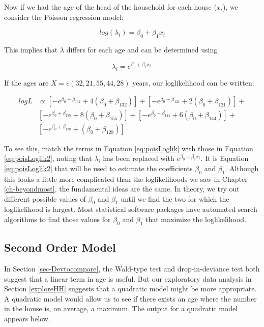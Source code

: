 \documentclass[
]{krantz}
\begin{document}
Now if we had the age of the head of the household for each house (\(x_i\)), we consider the Poisson regression model:

\[log(\lambda_i)=\beta_0+\beta_1x_i \]

This implies that \(\lambda\) differs for each age and can be determined using

\[\lambda_i=e^{\beta_0+\beta_1x_i.}\]

If the ages are \(X=c(32,21,55,44,28)\) years, our loglikelihood can be written:

\begin{align}
 logL & \propto [-e^{\beta_0+\beta_132}+4({\beta_0+\beta_132})]+
[-e^{\beta_0+\beta_121}+2({\beta_0+\beta_121})]+ \nonumber \\ 
&  [-e^{\beta_0+\beta_155}+8({\beta_0+\beta_155})]+
[-e^{\beta_0+\beta_144}+6({\beta_0+\beta_144})]+ \nonumber \\
  &  [-e^{\beta_0+\beta_128}+({\beta_0+\beta_128})]
\label{eq:poisLoglik2}
\end{align}

To see this, match the terms in Equation \eqref{eq:poisLoglik} with those in Equation \eqref{eq:poisLoglik2}, noting that \(\lambda_i\) has been replaced with \(e^{\beta_0+\beta_1x_i}\). It is Equation \eqref{eq:poisLoglik2} that will be used to estimate the coefficients \(\beta_0\) and \(\beta_1\). Although this looks a little more complicated than the loglikelihoods we saw in Chapter \ref{ch-beyondmost}, the fundamental ideas are the same. In theory, we try out different possible values of \(\beta_0\) and \(\beta_1\) until we find the two for which the loglikelihood is largest. Most statistical software packages have automated search algorithms to find those values for \(\beta_0\) and \(\beta_1\) that maximize the loglikelihood.

\subsection{Second Order Model}\label{second-order-model}

In Section \ref{sec-Devtocompare}, the Wald-type test and drop-in-deviance test both suggest that a linear term in age is useful. But our exploratory data analysis in Section \ref{exploreHH} suggests that a quadratic model might be more appropriate. A quadratic model would allow us to see if there exists an age where the number in the house is, on average, a maximum. The output for a quadratic model appears below.
\end{document}
